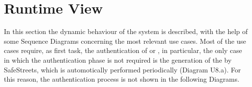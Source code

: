 \documentclass[../../DD.tex]{subfiles}
\begin{document}
\section{Runtime View\label{sect:2.4}}

In this section the dynamic behaviour of the system is described, with the help of some Sequence Diagrams concerning the most relevant use cases.
Most of the use cases require, as first task, the authentication of  or , in particular, the only case in which the authentication phase is not required is the generation of the  by SafeStreets, which is automotically performed periodically (Diagram U8.a). For this reason, the authentication process is not shown in the following Diagrams.


\newpage
\end{document}
